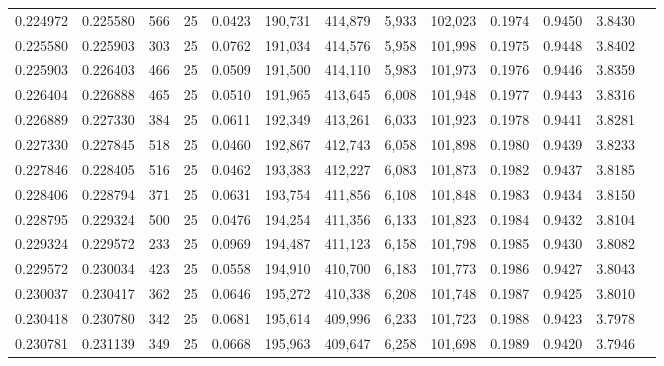 \begin{tabular}{rrrrrrrrrrrrr}
0.224972 & 0.225580 &   566 &  25 &                                     0.0423 & 190,731 & 414,879 &   5,933 & 102,023 & 0.1974 & 0.9450 & 3.8430 \\
0.225580 & 0.225903 &   303 &  25 &                                     0.0762 & 191,034 & 414,576 &   5,958 & 101,998 & 0.1975 & 0.9448 & 3.8402 \\
0.225903 & 0.226403 &   466 &  25 &                                     0.0509 & 191,500 & 414,110 &   5,983 & 101,973 & 0.1976 & 0.9446 & 3.8359 \\
0.226404 & 0.226888 &   465 &  25 &                                     0.0510 & 191,965 & 413,645 &   6,008 & 101,948 & 0.1977 & 0.9443 & 3.8316 \\
0.226889 & 0.227330 &   384 &  25 &                                     0.0611 & 192,349 & 413,261 &   6,033 & 101,923 & 0.1978 & 0.9441 & 3.8281 \\
0.227330 & 0.227845 &   518 &  25 &                                     0.0460 & 192,867 & 412,743 &   6,058 & 101,898 & 0.1980 & 0.9439 & 3.8233 \\
0.227846 & 0.228405 &   516 &  25 &                                     0.0462 & 193,383 & 412,227 &   6,083 & 101,873 & 0.1982 & 0.9437 & 3.8185 \\
0.228406 & 0.228794 &   371 &  25 &                                     0.0631 & 193,754 & 411,856 &   6,108 & 101,848 & 0.1983 & 0.9434 & 3.8150 \\
0.228795 & 0.229324 &   500 &  25 &                                     0.0476 & 194,254 & 411,356 &   6,133 & 101,823 & 0.1984 & 0.9432 & 3.8104 \\
0.229324 & 0.229572 &   233 &  25 &                                     0.0969 & 194,487 & 411,123 &   6,158 & 101,798 & 0.1985 & 0.9430 & 3.8082 \\
0.229572 & 0.230034 &   423 &  25 &                                     0.0558 & 194,910 & 410,700 &   6,183 & 101,773 & 0.1986 & 0.9427 & 3.8043 \\
0.230037 & 0.230417 &   362 &  25 &                                     0.0646 & 195,272 & 410,338 &   6,208 & 101,748 & 0.1987 & 0.9425 & 3.8010 \\
0.230418 & 0.230780 &   342 &  25 &                                     0.0681 & 195,614 & 409,996 &   6,233 & 101,723 & 0.1988 & 0.9423 & 3.7978 \\
0.230781 & 0.231139 &   349 &  25 &                                     0.0668 & 195,963 & 409,647 &   6,258 & 101,698 & 0.1989 & 0.9420 & 3.7946 \\

\end{tabular}
